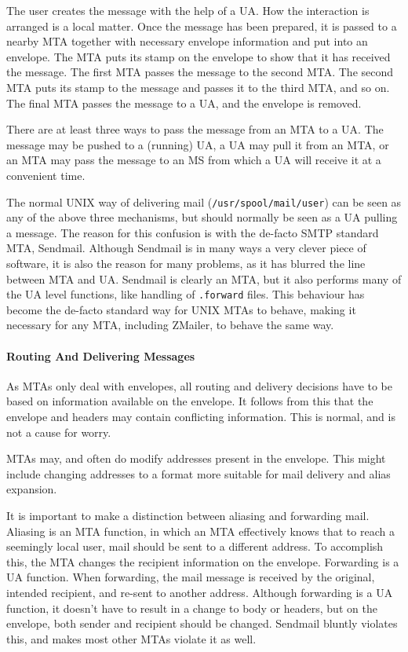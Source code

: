 The user creates the message with the help of a UA. How the interaction 
is arranged is a local matter. Once the message has been prepared, 
it is passed to a nearby MTA together with necessary envelope 
information and put into an envelope. The MTA puts its stamp on 
the envelope to show that it has received the message. The first 
MTA passes the message to the second MTA. The second MTA puts its 
stamp to the message and passes it to the third MTA, and so on. 
The final MTA passes the message to a UA, and the envelope is removed.

There are at least three ways to pass the message from an MTA to a UA. 
The message may be pushed to a (running) UA, a UA may pull it from an MTA, 
or an MTA may pass the message to an MS from which a UA will receive it at 
a convenient time.

The normal UNIX way of delivering mail ({\tt /usr/spool/mail/user}) can be 
seen as any of the above three mechanisms, but should normally be seen as a 
UA pulling a message. The reason for this confusion is with the de-facto SMTP 
standard MTA, Sendmail. Although Sendmail is in many ways a very clever 
piece of software, it is also the reason for many problems, as it has 
blurred the line between MTA and UA. Sendmail is clearly an MTA, but 
it also performs many of the UA level functions, like handling of 
{\tt .forward} files. This behaviour has become the de-facto standard 
way for UNIX MTAs to behave, making it necessary for any MTA, including
ZMailer, to behave the same way.



\paragraph{Routing And Delivering Messages}



As MTAs only deal with envelopes, all routing and delivery decisions have to be
based on information available on the envelope. It follows from this that 
the envelope and headers may contain conflicting information. This is normal, 
and is not a cause for worry.

MTAs may, and often do modify addresses present in the envelope. This might 
include changing addresses to a format more suitable for mail delivery and 
alias expansion.

It is important to make a distinction between aliasing and forwarding mail. 
Aliasing is an MTA function, in which an MTA effectively knows that to reach 
a seemingly local user, mail should be sent to a different address. 
To accomplish this, the MTA changes the recipient information on the envelope. 
Forwarding is a UA function. When forwarding, the mail message is received 
by the original, intended recipient, and re-sent to another address. Although 
forwarding is a UA function, it doesn't have to result in a change to body or 
headers, but on the envelope, both sender and recipient should be changed. 
Sendmail bluntly violates this, and makes most other MTAs violate it as well.

